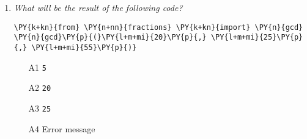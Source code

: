 \begin{enumerate}
\begin{enumerate}
\item[A1] 
\begin{Verbatim}[commandchars=\\\{\}]
\PY{k+kn}{from} \PY{n+nn}{fractions} \PY{k+kn}{import} \PY{n}{gcd}
\PY{n}{gcd}\PY{p}{(}\PY{l+m+mi}{1377}\PY{p}{,} \PY{l+m+mi}{4131}\PY{p}{)}
\end{Verbatim}
\item[A2]
\begin{Verbatim}[commandchars=\\\{\}]
\PY{k+kn}{from} \PY{n+nn}{fractions} \PY{k+kn}{import} \PY{n}{Fraction, gcd}
\PY{n}{gcd}\PY{p}{(}\PY{l+m+mi}{1377}\PY{p}{,} \PY{l+m+mi}{4131}\PY{p}{)}
\end{Verbatim}
\item[A3]
\begin{Verbatim}[commandchars=\\\{\}]
\PY{k+kn}{from} \PY{n+nn}{fractions} \PY{k+kn}{import} \PY{n}{*}
\PY{n}{gcd}\PY{p}{(}\PY{l+m+mi}{1377}\PY{p}{,} \PY{l+m+mi}{4131}\PY{p}{)}
\end{Verbatim}
\item[A4]
\begin{Verbatim}[commandchars=\\\{\}]
\PY{k+kn}{from} \PY{n+nn}{fractions} \PY{k+kn}{import} \PY{n}{*}
\PY{n}{gcd}\PY{p}{(}\PY{l+m+mi}{4131}\PY{p}{,} \PY{l+m+mi}{1377}\PY{p}{)}
\end{Verbatim}
\end{enumerate}

\vspace{6mm}

\item {\em What will be the result of the following code?}\\

\begin{Verbatim}[commandchars=\\\{\}]
\PY{k+kn}{from} \PY{n+nn}{fractions} \PY{k+kn}{import} \PY{n}{gcd}
\PY{n}{gcd}\PY{p}{(}\PY{l+m+mi}{20}\PY{p}{,} \PY{l+m+mi}{25}\PY{p}{,} \PY{l+m+mi}{55}\PY{p}{)}
\end{Verbatim}
\vspace{6mm}

\begin{enumerate}
\item[A1] {\tt 5}
\item[A2] {\tt 20}
\item[A3] {\tt 25}
\item[A4] Error message
\end{enumerate}


\end{enumerate}
